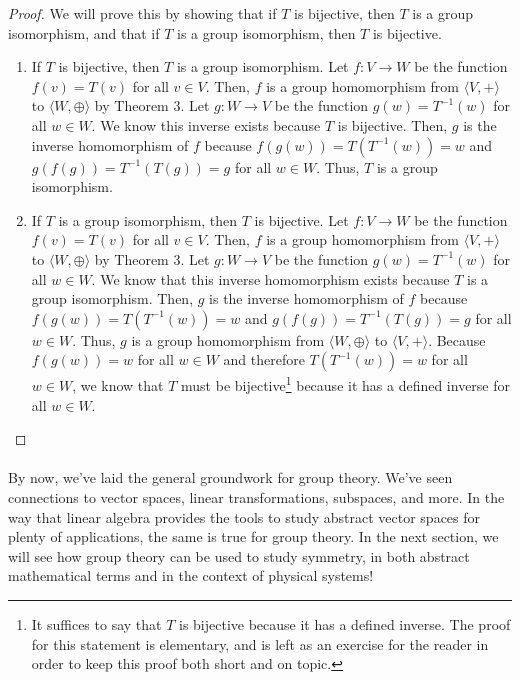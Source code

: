 \documentclass[twoside]{article}
\newcommand{\done}{\renewcommand\qedsymbol{$\blacksquare$}}
\begin{document}
\begin{proof}
  We will prove this by showing that if $T$ is bijective, then $T$ is a group isomorphism, and that if $T$ is a group isomorphism, then $T$ is bijective.
  \begin{enumerate}
    \item If $T$ is bijective, then $T$ is a group isomorphism. 
    Let $f:V\rightarrow W$ be the function $f(v) = T(v)$ for all $v\in V$. 
    Then, $f$ is a group homomorphism from $\langle V, + \rangle$ to 
    $\langle W, \oplus \rangle$ by Theorem 3. Let $g:W\rightarrow V$ be the 
    function $g(w) = T^{-1}(w)$ for all $w\in W$. We know this 
    inverse exists because $T$ is bijective. Then, $g$ is the inverse 
    homomorphism of $f$ because $f(g(w)) = T(T^{-1}(w)) = w$ and 
    $g(f(g)) = T^{-1}(T(g)) = g$ for all $w\in W$. Thus, $T$ is a group isomorphism.

    \item If $T$ is a group isomorphism, then $T$ is bijective. 
    Let $f:V\rightarrow W$ be the function $f(v) = T(v)$ for all $v\in V$. 
    Then, $f$ is a group homomorphism from $\langle V, + \rangle$ to 
    $\langle W, \oplus \rangle$ by Theorem 3. Let $g:W\rightarrow V$ be the 
    function $g(w) = T^{-1}(w)$ for all $w\in W$. We know 
    that this inverse homomorphism exists because $T$ is a group 
    isomorphism. Then, $g$ is the inverse 
    homomorphism of $f$ because $f(g(w)) = T(T^{-1}(w)) = w$ and 
    $g(f(g)) = T^{-1}(T(g)) = g$ for all $w\in W$. Thus, $g$ is a group 
    homomorphism from $\langle W, \oplus \rangle$ to $\langle V, + \rangle$. 
    Because $f(g(w)) = w$ for all $w\in W$ and therefore $T(T^{-1}(w)) = w$ for all $w\in W$,
    we know that $T$ must be bijective\footnote[4]{
      It suffices to say that $T$ is bijective because it has a defined inverse. The 
      proof for this statement is elementary, and is left as an exercise for the reader 
      in order to keep this proof both short and on topic.
    } because it has a defined inverse for all $w\in W$.
  \end{enumerate}   
\done
\end{proof}

\paragraph*{} By now, we've laid the general groundwork for group theory. We've seen
connections to vector spaces, linear transformations, subspaces, and more. In the way
that linear algebra provides the tools to study abstract vector spaces for plenty 
of applications, the same is true for group theory. In the next section, we will see
how group theory can be used to study symmetry, in both abstract mathematical terms 
and in the context of physical systems! 
\end{document}
